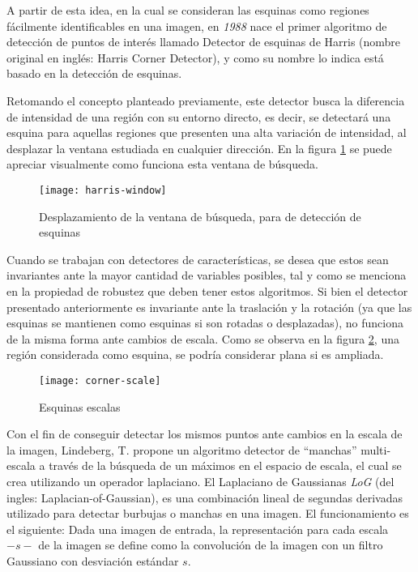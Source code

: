 A partir de esta idea, en la cual se consideran las esquinas como regiones fácilmente identificables en una imagen, en \textit{1988} nace el primer algoritmo de detección de puntos de interés llamado Detector de esquinas de Harris \cite{harris} (nombre original en inglés: Harris Corner Detector), y como su nombre lo indica está basado en la detección de esquinas.

Retomando el concepto planteado previamente, este detector busca la diferencia de intensidad de una región con su entorno directo, es decir, se detectará una esquina para aquellas regiones que presenten una alta variación de intensidad, al desplazar la ventana estudiada en cualquier dirección. En la figura \ref{imagen:harris-window} se puede apreciar visualmente como funciona esta ventana de búsqueda.

\begin{figure}[H]
	\centering
	\texttt{[image: harris-window]}
	\caption[Deteccion de esquinas]{Desplazamiento de la ventana de búsqueda, para de detección de esquinas}
	\label{imagen:harris-window}
\end{figure}

Cuando se trabajan con detectores de características, se desea que estos sean invariantes ante la mayor cantidad de variables posibles, tal y como se menciona en la propiedad de robustez que deben tener estos algoritmos. Si bien el detector presentado anteriormente es invariante ante la traslación y la rotación (ya que las esquinas se mantienen como esquinas si son rotadas o desplazadas), no funciona de la misma forma ante cambios de escala. Como se observa en la figura \ref{imagen:corner-scale}, una región considerada como esquina, se podría considerar plana si es ampliada.

\begin{figure}[H]
	\centering
	\texttt{[image: corner-scale]}
	\caption[Deteccion de esquinas]{Esquinas escalas}
	\label{imagen:corner-scale}
\end{figure}

Con el fin de conseguir detectar los mismos puntos ante cambios en la escala de la imagen, Lindeberg, T. \cite{log} propone un algoritmo detector de ``manchas'' multi-escala a través de la búsqueda de un máximos en el espacio de escala, el cual se crea utilizando un operador laplaciano. El Laplaciano de Gaussianas \textit{LoG} (del ingles: Laplacian-of-Gaussian), es una combinación lineal de segundas derivadas utilizado para detectar burbujas o manchas en una imagen. El funcionamiento es el siguiente: Dada una imagen de entrada, la representación para cada escala $-s-$ de la imagen se define como la convolución de la imagen con un filtro Gaussiano con desviación estándar $s$.

